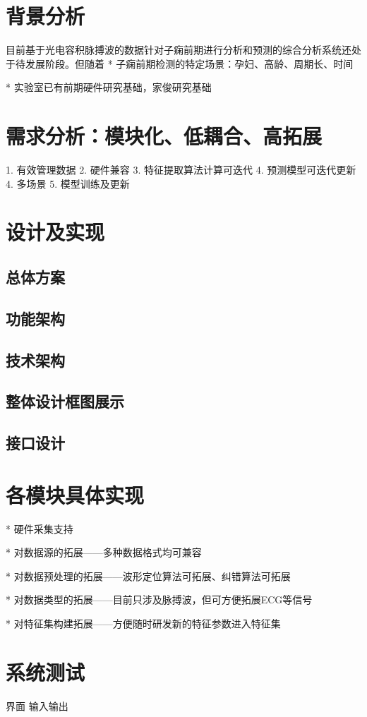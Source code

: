 \section{背景分析}
目前基于光电容积脉搏波的数据针对子痫前期进行分析和预测的综合分析系统还处于待发展阶段。但随着
* 子痫前期检测的特定场景：孕妇、高龄、周期长、时间

* 实验室已有前期硬件研究基础，家俊研究基础

\section{需求分析：模块化、低耦合、高拓展}
1. 有效管理数据
2. 硬件兼容
3. 特征提取算法计算可迭代
4. 预测模型可迭代更新
4. 多场景
5. 模型训练及更新

\section{设计及实现}
\subsection{总体方案}
\subsection{功能架构}
\subsection{技术架构}
\subsection{整体设计框图展示}
\subsection{接口设计}
\section{各模块具体实现}
* 硬件采集支持

* 对数据源的拓展——多种数据格式均可兼容

* 对数据预处理的拓展——波形定位算法可拓展、纠错算法可拓展

* 对数据类型的拓展——目前只涉及脉搏波，但可方便拓展ECG等信号

* 对特征集构建拓展——方便随时研发新的特征参数进入特征集

\section{系统测试}
界面
输入输出
